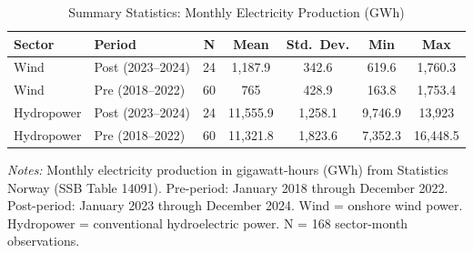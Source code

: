 \begin{table}[H]
\centering
\caption{Summary Statistics: Monthly Electricity Production (GWh)}
\label{tab:summary}
\begin{threeparttable}
\begin{tabular}{llccccc}
\toprule
Sector & Period & N & Mean & Std.\ Dev. & Min & Max \\
\midrule
Wind & Post (2023--2024) & 24 & 1,187.9 & 342.6 & 619.6 & 1,760.3 \\
Wind & Pre (2018--2022) & 60 & 765 & 428.9 & 163.8 & 1,753.4 \\
\midrule
Hydropower & Post (2023--2024) & 24 & 11,555.9 & 1,258.1 & 9,746.9 & 13,923 \\
Hydropower & Pre (2018--2022) & 60 & 11,321.8 & 1,823.6 & 7,352.3 & 16,448.5 \\
\bottomrule
\end{tabular}
\begin{tablenotes}[flushleft]
\small
\item \textit{Notes:} Monthly electricity production in gigawatt-hours (GWh) from Statistics Norway (SSB Table 14091). Pre-period: January 2018 through December 2022. Post-period: January 2023 through December 2024. Wind = onshore wind power. Hydropower = conventional hydroelectric power. N = 168 sector-month observations.
\end{tablenotes}
\end{threeparttable}
\end{table}

